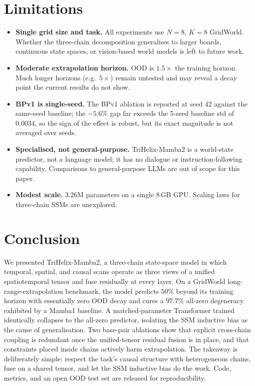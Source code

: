 \section{Limitations}
\label{sec:limits}

\begin{itemize}[leftmargin=*,itemsep=2pt]
  \item \textbf{Single grid size and task.} All experiments use $N{=}8$,
        $K{=}8$ GridWorld. Whether the three-chain decomposition generalises to
        larger boards, continuous state spaces, or vision-based world models is
        left to future work.
  \item \textbf{Moderate extrapolation horizon.} OOD is $1.5\times$ the training
        horizon. Much longer horizons (e.g.\ $5\times$) remain untested and may
        reveal a decay point the current results do not show.
  \item \textbf{BPv1 is single-seed.} The BPv1 ablation is reported at seed 42
        against the same-seed baseline; the $-5.6\%$ gap far exceeds the
        5-seed baseline std of $0.0034$, so the sign of the effect is robust,
        but its exact magnitude is not averaged over seeds.
  \item \textbf{Specialised, not general-purpose.} TriHelix-Mamba2 is a
        world-state predictor, not a language model; it has no dialogue or
        instruction-following capability. Comparisons to general-purpose LLMs
        are out of scope for this paper.
  \item \textbf{Modest scale.} 3.26M parameters on a single 8\,GB GPU. Scaling
        laws for three-chain SSMs are unexplored.
\end{itemize}

\section{Conclusion}
\label{sec:conclusion}

We presented TriHelix-Mamba2, a three-chain state-space model in which
temporal, spatial, and causal scans operate as three views of a unified
spatiotemporal tensor and fuse residually at every layer. On a GridWorld
long-range-extrapolation benchmark, the model predicts $50\%$ beyond its
training horizon with essentially zero OOD decay and cures a $97.7\%$
all-zero degeneracy exhibited by a Mamba1 baseline. A matched-parameter
Transformer trained identically collapses to the all-zero predictor, isolating
the SSM inductive bias as the cause of generalisation. Two base-pair ablations
show that explicit cross-chain coupling is redundant once the unified-tensor
residual fusion is in place, and that constraints placed inside chains actively
harm extrapolation. The takeaway is deliberately simple: respect the task's
causal structure with heterogeneous chains, fuse on a shared tensor, and let
the SSM inductive bias do the work. Code, metrics, and an open OOD test set are
released for reproducibility.
